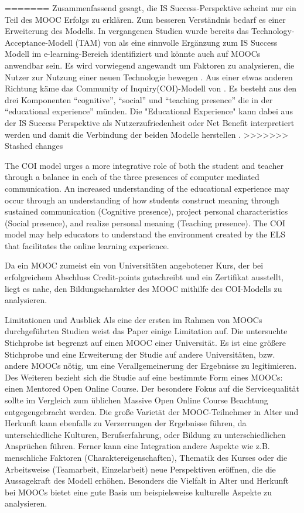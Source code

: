 =======
Zusammenfassend gesagt, die IS Success-Perspektive scheint nur ein Teil des MOOC Erfolgs zu erklären. Zum besseren Verständnis bedarf es einer Erweiterung des Modells. In vergangenen Studien wurde bereits das Technology-Acceptance-Modell (TAM) von \textcite{bagozzi1992development} als eine sinnvolle Ergänzung zum IS Success Modell im e-learning-Bereich identifiziert \parencite{mohammadi2015factors} und könnte auch auf MOOCs anwendbar sein. Es wird vorwiegend angewandt um Faktoren zu analysieren, die Nutzer zur Nutzung einer neuen Technologie bewegen \parencite[vgl.][S.702]{mohammadi2015factors}.  
Aus einer etwas anderen Richtung käme das Community of Inquiry(COI)-Modell von \textcite{garrison1999critical}. Es besteht aus den drei Komponenten "`cognitive"',  "`social"' und "`teaching presence"' die in der "`educational experience"'  münden. Die "Educational Experience" kann dabei aus der IS Success Perspektive als Nutzerzufriedenheit oder Net Benefit interpretiert werden und damit die Verbindung der beiden Modelle herstellen \parencite[vgl.][S.179]{freeze2010success}.  
>>>>>>> Stashed changes

The COI model urges a more integrative role of both the student and teacher through a balance in each of the three presences of computer mediated communication. An increased understanding of the educational experience may occur through an understanding of how students construct meaning through sustained communication (Cognitive presence), project personal characteristics (Social presence), and realize personal meaning (Teaching presence). The COI model may help educators to understand the environment created by the ELS that facilitates the online learning experience.

Da ein MOOC zumeist ein von Universitäten angebotener Kurs, der bei erfolgreichem Abschluss Credit-points gutschreibt und ein Zertifikat ausstellt, liegt es nahe, den Bildungscharakter des MOOC mithilfe des COI-Modells zu analysieren.     

Limitationen und Ausblick
Als eine der ersten im Rahmen von MOOCs durchgeführten Studien weist das Paper einige Limitation auf. Die untersuchte Stichprobe ist begrenzt auf einen MOOC einer Universität. Es ist eine größere Stichprobe und eine Erweiterung der Studie auf andere Universitäten, bzw. andere MOOCs nötig, um eine Verallgemeinerung der Ergebnisse zu legitimieren. Des Weiteren bezieht sich die Studie auf eine bestimmte Form eines MOOCs: einen Mentored Open Online Course. Der besondere Fokus auf die Servicequalität sollte im Vergleich zum üblichen Massive Open Online Course Beachtung entgegengebracht werden. Die große Varietät der MOOC-Teilnehmer in Alter und Herkunft kann ebenfalls zu Verzerrungen der Ergebnisse führen, da unterschiedliche Kulturen, Berufserfahrung, oder Bildung zu unterschiedlichen Ansprüchen führen. 
Ferner kann eine Integration andere Aspekte wie z.B. menschliche Faktoren (Charaktereigenschaften), Thematik des Kurses oder die Arbeitsweise (Teamarbeit, Einzelarbeit) neue Perspektiven eröffnen, die die Aussagekraft des Modell erhöhen. Besonders die Vielfalt in Alter und Herkunft bei MOOCs bietet eine gute Basis um beispielsweise kulturelle Aspekte zu analysieren.  

